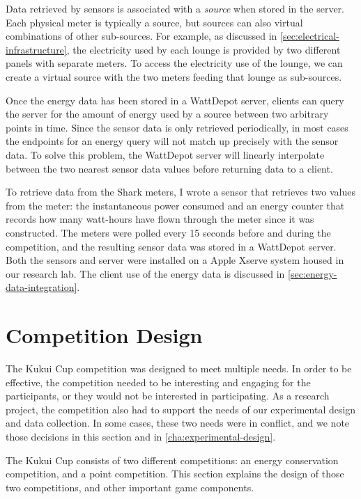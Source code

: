 Data retrieved by sensors is associated with a \emph{source} when stored in the server. Each physical meter is typically a source, but sources can also virtual combinations of other sub-sources. For example, as discussed in \autoref{sec:electrical-infrastructure}, the electricity used by each lounge is provided by two different panels with separate meters. To access the electricity use of the lounge, we can create a virtual source with the two meters feeding that lounge as sub-sources. 

Once the energy data has been stored in a WattDepot server, clients can query the server for the amount of energy used by a source between two arbitrary points in time. Since the sensor data is only retrieved periodically, in most cases the endpoints for an energy query will not match up precisely with the sensor data. To solve this problem, the WattDepot server will linearly interpolate between the two nearest sensor data values before returning data to a client.

To retrieve data from the Shark meters, I wrote a sensor that retrieves two values from the meter: the instantaneous power consumed and an energy counter that records how many watt-hours have flown through the meter since it was constructed. The meters were polled every 15 seconds before and during the competition, and the resulting sensor data was stored in a WattDepot server. Both the sensors and server were installed on a Apple Xserve system housed in our research lab. The client use of the energy data is discussed in \autoref{sec:energy-data-integration}.


\section{Competition Design}

The Kukui Cup competition was designed to meet multiple needs. In order to be effective, the competition needed to be interesting and engaging for the participants, or they would not be interested in participating. As a research project, the competition also had to support the needs of our experimental design and data collection. In some cases, these two needs were in conflict, and we note those decisions in this section and in \autoref{cha:experimental-design}.

The Kukui Cup consists of two different competitions: an energy conservation competition, and a point competition. This section explains the design of those two competitions, and other important game components.


